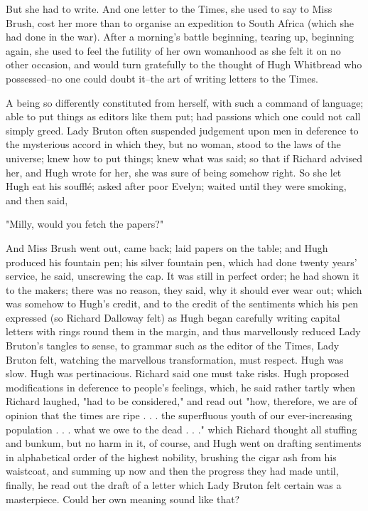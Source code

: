 \documentclass[lang=cn,10pt]{elegantbook}
\begin{document}
But she had to write.  And one letter to the Times, she used to say
to Miss Brush, cost her more than to organise an expedition to
South Africa (which she had done in the war).  After a morning's
battle beginning, tearing up, beginning again, she used to feel the
futility of her own womanhood as she felt it on no other occasion,
and would turn gratefully to the thought of Hugh Whitbread who
possessed--no one could doubt it--the art of writing letters to the
Times.

A being so differently constituted from herself, with such a
command of language; able to put things as editors like them put;
had passions which one could not call simply greed.  Lady Bruton
often suspended judgement upon men in deference to the mysterious
accord in which they, but no woman, stood to the laws of the
universe; knew how to put things; knew what was said; so that if
Richard advised her, and Hugh wrote for her, she was sure of being
somehow right.  So she let Hugh eat his soufflé; asked after poor
Evelyn; waited until they were smoking, and then said,

"Milly, would you fetch the papers?"

And Miss Brush went out, came back; laid papers on the table; and
Hugh produced his fountain pen; his silver fountain pen, which had
done twenty years' service, he said, unscrewing the cap.  It was
still in perfect order; he had shown it to the makers; there was no
reason, they said, why it should ever wear out; which was somehow
to Hugh's credit, and to the credit of the sentiments which his pen
expressed (so Richard Dalloway felt) as Hugh began carefully
writing capital letters with rings round them in the margin, and
thus marvellously reduced Lady Bruton's tangles to sense, to
grammar such as the editor of the Times, Lady Bruton felt, watching
the marvellous transformation, must respect.  Hugh was slow.  Hugh
was pertinacious.  Richard said one must take risks.  Hugh proposed
modifications in deference to people's feelings, which, he said
rather tartly when Richard laughed, "had to be considered," and
read out "how, therefore, we are of opinion that the times are ripe
. . . the superfluous youth of our ever-increasing population . . .
what we owe to the dead . . ." which Richard thought all stuffing
and bunkum, but no harm in it, of course, and Hugh went on drafting
sentiments in alphabetical order of the highest nobility, brushing
the cigar ash from his waistcoat, and summing up now and then the
progress they had made until, finally, he read out the draft of a
letter which Lady Bruton felt certain was a masterpiece.  Could her
own meaning sound like that?
\end{document}
